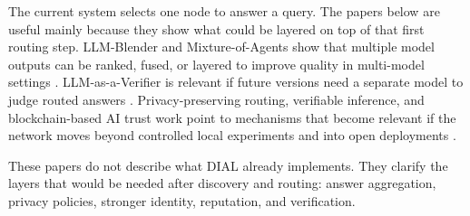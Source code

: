 The current system selects one node to answer a query. The papers below are
useful mainly because they show what could be layered on top of that first
routing step. LLM-Blender and Mixture-of-Agents show that multiple model
outputs can be ranked, fused, or layered to improve quality in multi-model settings
\citep{jiang2023llmblender,wang2024mixtureofagents}. LLM-as-a-Verifier is
relevant if future versions need a separate model to judge routed answers
\citep{kwok2026llmverifier}. Privacy-preserving routing, verifiable inference,
and blockchain-based AI trust work point to mechanisms that become relevant if
the network moves beyond controlled local experiments and into open deployments
\citep{wu2026privacyrouting,wang2026verillm,nassar2020blockchain}.

These papers do not describe what DIAL already implements. They clarify the
layers that would be needed after discovery and routing: answer aggregation,
privacy policies, stronger identity, reputation, and verification.
